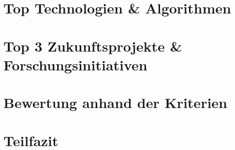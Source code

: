 \section{Top Technologien \& Algorithmen}
\section{Top 3 Zukunftsprojekte \& Forschungsinitiativen}
\section{Bewertung anhand der Kriterien}
\section{Teilfazit}


\printbibliography
